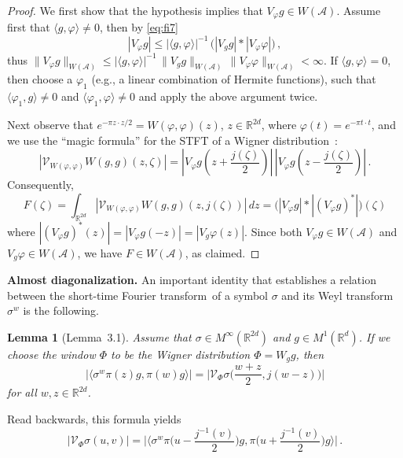 \documentclass[12pt]{amsart}
\newtheorem{lemma}{Lemma}[section]
\theoremstyle{definition}
\theoremstyle{remark}
\numberwithin{equation}{section}
\newcommand{\stft}{short-time Fourier transform}
\newcommand{\symbo}{\widetilde M^{\infty, \cA}}
\def\cA{\mathcal{A}}
\def\bR{{\mathbb{R}}}
\def\rd{\bR^d}
\def\rdd{{\bR^{2d}}}
\newcommand{\vf}{\varphi}
\def\intrdd{\int_{\rdd}}
\def\inv{^{-1}}
\def\cA{\mathcal{A}}
\def\cV{\mathcal{V}}
\begin{document}
\begin{proof}
We first show that the hypothesis implies that $V_\vf g \in W(\cA )$. 
Assume first that $\langle g, \vf \rangle \neq 0$, then by
\eqref{eq:fi7}
$$
|V_\vf g| \leq  |\langle g,\vf \rangle |\inv \, \big(|V_gg| \ast
|V_\vf \vf|\big) \, ,
$$
thus $\|V_\vf g\|_{W(\cA )} \leq |\langle g,\vf \rangle |\inv \,
\|V_gg\|_{W(\cA )} \, \|V_\vf \vf \|_{W(\cA )}<\infty $. If $\langle g, \vf
\rangle = 0$, then choose a $\vf _1$ (e.g., a linear combination of
Hermite 
functions), such that $\langle \vf _1, g\rangle \neq 0$ and $\langle \vf _1,
\vf \rangle \neq 0$ and apply the above argument twice. 



Next  observe that $e^{-\pi z\cdot z/2} = W(\vf , \vf )(z)$,
$z\in \rdd $, where $\vf (t) = e^{-\pi t\cdot t}$,  and we use the
``magic formula'' for the STFT of a 
Wigner distribution~\cite[Lemma~14.5.1]{book}:
$$
|\cV _{W(\vf , \vf )} W(g,g)(z,\zeta )| =|V_\vf g (z+\frac{j(\zeta )
  }{2})  |\, |V_\vf g (z-\frac{j(\zeta )}{2})    | \, .
$$
Consequently,
$$
 F(\zeta ) = \intrdd  |\cV _{W(\vf , \vf )} W(g,g)(z,j(\zeta ))| \, dz = \big(|V_\vf g|
\ast |(V_\vf g)^*|\big) (\zeta )
$$
where $|(V_\vf g )^* (z)| =|V_\vf g (-z)|=|V_g \vf (z)|$. 
Since both  $V_\vf g \in W(\cA )$ and   $V_g \vf  \in W(\cA )$, we
have $F \in W(\cA )$, as claimed. 
\end{proof}




\textbf{Almost diagonalization.} %
An important
identity that establishes a relation between the \stft\ of a
symbol $\sigma $ and its  Weyl transform $\sigma ^w$ is the following.

\begin{lemma}[Lemma~3.1\cite{gro06}]
  Assume that
  $\sigma \in M^\infty (\rdd )$ and $g\in M^1 (\rd )$. %
  If we choose the window
  $\Phi $ to be the Wigner distribution $\Phi  =
  W_gg$, then
\begin{equation}\label{eq:4a}
\big|\langle \sigma ^w \pi (z)g , \pi (w) g \rangle \big| =
\Big|\cV_\Phi \sigma \Big(\frac{w+z}{2}, j(w-z)\Big)\Big|
\end{equation}
 for all $w,z\in \rdd $.
\end{lemma}

 Read backwards, this  formula yields
\begin{equation}
  \label{eq:5a}
  |\cV_\Phi \sigma (u,v)| = \Big|\Big\langle \sigma ^w  \pi \Big(u-\frac{j\inv
  (v)}{2}\Big)g, \pi \Big(u+\frac{j\inv   (v)}{2}\Big)g \Big\rangle
\Big| \, .
\end{equation}
\end{document}
